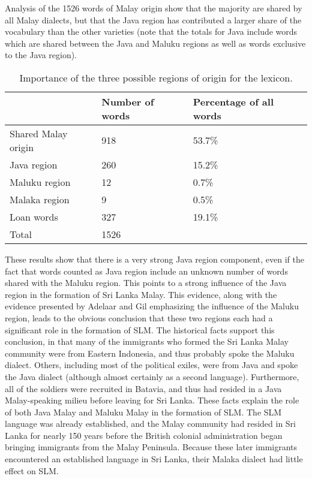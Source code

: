 Analysis of the 1526 words of Malay origin show that the majority are shared by all Malay dialects, but that the Java region has contributed a larger share of the vocabulary than the other varieties (note that the totals for Java include words which are shared between the Java and Maluku regions as well as words exclusive to the Java region).

\begin{table}
\centering
\begin{tabular}{lll}
 &
\textbf{Number of words} &
\textbf{Percentage of all words}\\\hline
Shared Malay origin &
918 &
53.7\%\\
Java region &
260 &
15.2\%\\
Maluku region &
12 &
0.7\%\\
Malaka region &
9 &
0.5\%\\
Loan words\footnotemark{} &
327 &
19.1\%\\\hline
\multicolumn{1}{l}{Total} &
\multicolumn{1}{l}{1526} &
\\
\end{tabular}
\caption{Importance of the three possible regions of origin for the lexicon.}
\label{paauw:tab:detailedoriginoflexemes}
\end{table}

These results show that there is a very strong Java region component, even if the fact that words counted as Java region include an unknown number of words shared with the Maluku region. This points to a strong influence of the Java region in the formation of Sri Lanka Malay. This evidence, along with the evidence presented by Adelaar and Gil emphasizing the influence of the Maluku region, leads to the obvious conclusion that these two regions each had a significant role in the formation of SLM. The historical facts support this conclusion, in that many of the immigrants who formed the Sri Lanka Malay community were from Eastern Indonesia, and thus probably spoke the Maluku dialect. Others, including most of the political exiles, were from Java and spoke the Java dialect (although almost certainly as a second language). Furthermore, all of the soldiers were recruited in Batavia, and thus had resided in a Java Malay-speaking milieu before leaving for Sri Lanka. These facts explain the role of both Java Malay and Maluku Malay in the formation of SLM. The SLM language was already established, and the Malay community had resided in Sri Lanka for nearly 150 years before the British colonial administration began bringing immigrants from the Malay Peninsula. Because these later immigrants encountered an established language in Sri Lanka, their Malaka dialect had little effect on SLM.

